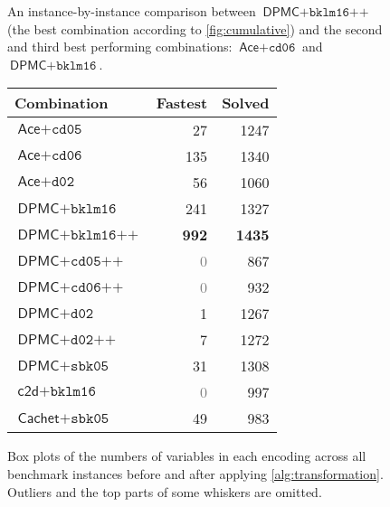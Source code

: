 \documentclass[runningheads]{llncs}
\begin{document}
\begin{figure}
  \centering
  \caption{An instance-by-instance comparison between $\textsf{DPMC} +
    \texttt{bklm16++}$ (the best combination according to \cref{fig:cumulative})
  and the second and third best performing combinations: $\textsf{Ace} +
  \texttt{cd06}$ and $\textsf{DPMC} + \texttt{bklm16}$.}
  \label{fig:scatter}
\end{figure}

\begin{figure}
  \centering
  \begin{minipage}{0.49\textwidth}
    \centering
    \caption{Box plots of the numbers of variables in each encoding across all
      benchmark instances before and after applying \cref{alg:transformation}.
      Outliers and the top parts of some whiskers are
      omitted.}\label{fig:box}
  \end{minipage}\hfill
  \begin{minipage}{0.49\textwidth}
    \centering
    \label{tbl:performance}
    \begin{tabular}{lrr}
      \toprule
      Combination & Fastest & Solved \\
      \midrule
      $\textsf{Ace} + \texttt{cd05}$ & 27 & 1247 \\
      $\textsf{Ace} + \texttt{cd06}$ & 135 & 1340 \\
      $\textsf{Ace} + \texttt{d02}$ & 56 & 1060 \\
      $\textsf{DPMC} + \texttt{bklm16}$ & 241 & 1327 \\
      $\textsf{DPMC} + \texttt{bklm16++}$ & \textbf{992} & \textbf{1435} \\
      $\textsf{DPMC} + \texttt{cd05++}$ & \textcolor{gray}{0} & 867 \\
      $\textsf{DPMC} + \texttt{cd06++}$ & \textcolor{gray}{0} & 932 \\
      $\textsf{DPMC} + \texttt{d02}$ & 1 & 1267 \\
      $\textsf{DPMC} + \texttt{d02++}$ & 7 & 1272 \\
      $\textsf{DPMC} + \texttt{sbk05}$ & 31 & 1308 \\
      $\textsf{c2d} + \texttt{bklm16}$ & \textcolor{gray}{0} & 997 \\
      $\textsf{Cachet} + \texttt{sbk05}$ & 49 & 983 \\
      \bottomrule
    \end{tabular}
  \end{minipage}
\end{figure}
\end{document}
